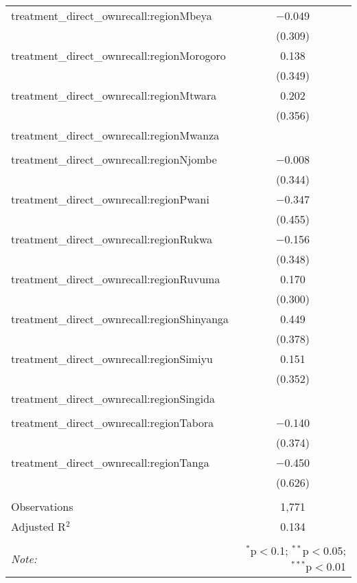 \begin{table}[!htbp]
\begin{tabular}{@{\extracolsep{5pt}}lc}
  treatment\_direct\_ownrecall:regionMbeya & $-$0.049 \\ 
  & (0.309) \\ 
  treatment\_direct\_ownrecall:regionMorogoro & 0.138 \\ 
  & (0.349) \\ 
  treatment\_direct\_ownrecall:regionMtwara & 0.202 \\ 
  & (0.356) \\ 
  treatment\_direct\_ownrecall:regionMwanza &  \\ 
  &  \\ 
  treatment\_direct\_ownrecall:regionNjombe & $-$0.008 \\ 
  & (0.344) \\ 
  treatment\_direct\_ownrecall:regionPwani & $-$0.347 \\ 
  & (0.455) \\ 
  treatment\_direct\_ownrecall:regionRukwa & $-$0.156 \\ 
  & (0.348) \\ 
  treatment\_direct\_ownrecall:regionRuvuma & 0.170 \\ 
  & (0.300) \\ 
  treatment\_direct\_ownrecall:regionShinyanga & 0.449 \\ 
  & (0.378) \\ 
  treatment\_direct\_ownrecall:regionSimiyu & 0.151 \\ 
  & (0.352) \\ 
  treatment\_direct\_ownrecall:regionSingida &  \\ 
  &  \\ 
  treatment\_direct\_ownrecall:regionTabora & $-$0.140 \\ 
  & (0.374) \\ 
  treatment\_direct\_ownrecall:regionTanga & $-$0.450 \\ 
  & (0.626) \\ 
 \hline \\[-1.8ex] 
Observations & 1,771 \\ 
Adjusted R$^{2}$ & 0.134 \\ 
\hline 
\hline \\[-1.8ex] 
\textit{Note:}  & \multicolumn{1}{r}{$^{*}$p$<$0.1; $^{**}$p$<$0.05; $^{***}$p$<$0.01} \\ 
\end{tabular} 
\end{table} 
